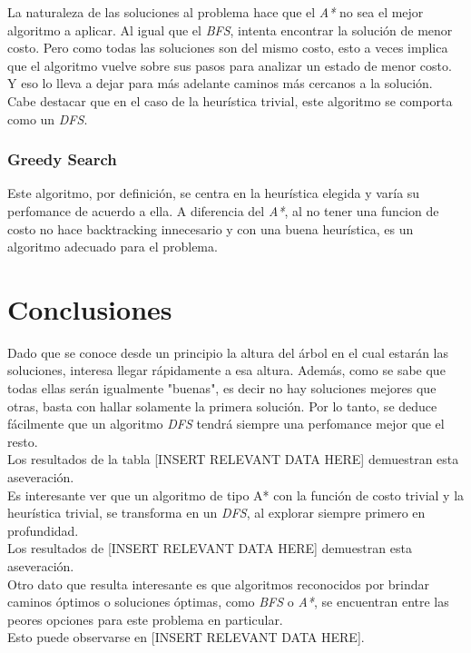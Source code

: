 \documentclass[a4paper,10pt]{article}
\begin{document}
    La naturaleza de las soluciones al problema hace que el \textit{A*} no sea el mejor algoritmo a aplicar. Al igual que el \textit{BFS}, intenta encontrar la solución de menor costo.
    Pero como todas las soluciones son del mismo costo, esto a veces implica que el algoritmo vuelve sobre sus pasos para analizar un estado de menor costo.
    Y eso lo lleva a dejar para más adelante caminos más cercanos a la solución. \\
    Cabe destacar que en el caso de la heurística trivial, este algoritmo se comporta como un \textit{DFS}.


    \subsubsection{Greedy Search}
    
    Este algoritmo, por definición, se centra en la heurística elegida y varía su perfomance de acuerdo a ella.
    A diferencia del \textit{A*}, al no tener una funcion de costo no hace backtracking innecesario y con una buena heurística, es un algoritmo adecuado para el problema.


\section{Conclusiones}
    Dado que se conoce desde un principio la altura del árbol en el cual estarán las soluciones, interesa llegar rápidamente a esa altura. Además, como se sabe que todas ellas serán 
    igualmente "buenas", es decir no hay soluciones mejores que otras, basta con hallar solamente la primera solución. Por lo tanto, se deduce fácilmente que un algoritmo 
    \textit{DFS} tendrá siempre una perfomance mejor que el resto. \\

    Los resultados de la tabla [INSERT RELEVANT DATA HERE] demuestran esta aseveración. \\

    Es interesante ver que un algoritmo de tipo A* con la función de costo trivial y la heurística trivial, se transforma en un \textit{DFS}, al explorar siempre 
    primero en profundidad. \\

    Los resultados de [INSERT RELEVANT DATA HERE] demuestran esta aseveración. \\

    Otro dato que resulta interesante es que algoritmos reconocidos por brindar caminos óptimos o soluciones óptimas, como \textit{BFS} o \textit{A*}, se encuentran entre las peores
    opciones para este problema en particular. \\

    Esto puede observarse en [INSERT RELEVANT DATA HERE].\\
\end{document}

